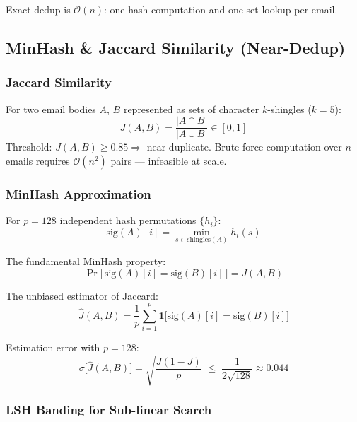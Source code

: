 \documentclass[11pt,a4paper]{article}
\begin{document}
Exact dedup is $\mathcal{O}(n)$: one hash computation and one set lookup per email.

\subsection{MinHash \& Jaccard Similarity (Near-Dedup)}

\subsubsection*{Jaccard Similarity}

For two email bodies $A$, $B$ represented as sets of character $k$-shingles
($k=5$):
\begin{equation}
  J(A,B) = \frac{|A \cap B|}{|A \cup B|} \in [0,1]
\end{equation}
Threshold: $J(A,B) \geq 0.85 \Rightarrow$ near-duplicate.
Brute-force computation over $n$ emails requires $\mathcal{O}(n^2)$ pairs —
infeasible at scale.

\subsubsection*{MinHash Approximation}

For $p=128$ independent hash permutations $\{h_i\}$:
\begin{equation}
  \text{sig}(A)[i] = \min_{s \in \text{shingles}(A)} h_i(s)
\end{equation}

The fundamental MinHash property:
\begin{equation}
  \Pr\!\bigl[\,\text{sig}(A)[i] = \text{sig}(B)[i]\,\bigr] = J(A,B)
\end{equation}

The unbiased estimator of Jaccard:
\begin{equation}
  \hat{J}(A,B) = \frac{1}{p}\sum_{i=1}^{p} \mathbf{1}\!\bigl[\text{sig}(A)[i] = \text{sig}(B)[i]\bigr]
\end{equation}

Estimation error with $p=128$:
\begin{equation}
  \sigma\!\bigl[\hat{J}(A,B)\bigr] = \sqrt{\frac{J(1-J)}{p}} \;\leq\;
  \frac{1}{2\sqrt{128}} \approx 0.044
\end{equation}

\subsubsection*{LSH Banding for Sub-linear Search}
\end{document}
